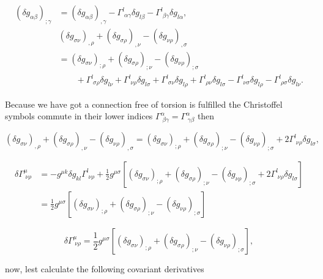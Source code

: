         \begin{align*}
            (\delta g_{\alpha\beta})_{;\gamma} &= (\delta g_{\alpha\beta})_{,\gamma} - \Gamma^{l}_{\;\alpha\gamma}\delta g_{l\beta} - \Gamma^l_{\;\beta \gamma}\delta g_{l\alpha},\\
            &(\delta g_{\sigma \nu})_{,\rho} + (\delta g_{\sigma\rho})_{,\nu} - 
(\delta g_{\nu\rho})_{,\sigma}\\
&= (\delta g_{\sigma\nu})_{;\rho} + (\delta g_{\sigma \rho})_{;\nu} - (\delta g_{\nu\rho})_{;\sigma}\\
&\qquad + \Gamma^l_{\;\sigma\rho}\delta g_{l\nu} + \Gamma^l_{\;\nu\rho}\delta g_{l\sigma} + \Gamma^l_{\;\sigma\nu}\delta g_{l\rho} + \Gamma^l_{\;\rho\nu}\delta g_{l\sigma} - \Gamma^l_{\;\nu\sigma}\delta g_{l\rho} - \Gamma^l_{\;\rho\sigma}\delta g_{l\nu}.
        \end{align*}

        Because we have got a connection free of torsion is fulfilled the Christoffel symbols commute in their lower indices $\Gamma^{\alpha}_{\;\beta\gamma} = \Gamma^{\alpha}_{\;\gamma\beta} $ then

        \begin{equation}
            (\delta g_{\sigma \nu})_{,\rho} + (\delta g_{\sigma\rho})_{,\nu} - (\delta g_{\nu\rho})_{,\sigma} = (\delta g_{\sigma\nu})_{;\rho} + (\delta g_{\sigma\rho})_{;\nu} - (\delta g_{\nu\rho})_{;\sigma} + 2\Gamma^l_{\;\nu\rho}\delta g_{l\sigma},
        \end{equation}

\begin{align*}
    \delta \Gamma^{\mu}_{\;\nu\rho} &= - g^{\mu k}\delta g_{kl} \Gamma^l_{\;\nu\rho} + \frac{1}{2}g^{\mu\sigma}\left[(\delta g_{\sigma\nu})_{;\rho} + (\delta g_{\sigma\rho})_{;\nu} - (\delta g_{\nu\rho})_{;\sigma} + 2\Gamma^l_{\;\nu\rho}\delta g_{l\sigma} \right]\\
    &= \frac{1}{2}g^{\mu\sigma}\left[(\delta g_{\sigma\nu})_{;\rho} + (\delta g_{\sigma\rho})_{;\nu} - (\delta g_{\nu\rho})_{;\sigma} \right]
\end{align*}

\begin{equation}
    \delta\Gamma^{\mu}_{\;\nu\rho} = \frac{1}{2}g^{\mu\sigma}\left[(\delta g_{\sigma\nu})_{;\rho} + (\delta g_{\sigma\rho})_{;\nu} - (\delta g_{\nu\rho})_{;\sigma} \right],
\end{equation}

now, lest calculate the following covariant derivatives

